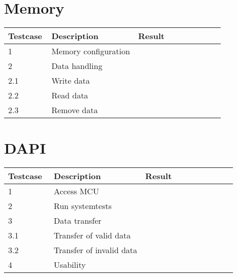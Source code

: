 \section{Memory}\label{test:memory}

\begin{longtable}[]{|m{0.2\linewidth}| m{0.4\linewidth}| m{0.4\linewidth}|} \hline
	\textbf{Testcase} & \textbf{Description} & \textbf{Result}\\ \hline
	\endhead
1 & Memory configuration &\\ \hline
2 & Data handling &\\ \hline
2.1 & Write data &\\ \hline
2.2 & Read data &\\ \hline
2.3 & Remove data &\\ \hline

\end{longtable}

\section{DAPI}\label{test:dapi}

\begin{longtable}[]{|m{0.2\linewidth}| m{0.4\linewidth}| m{0.4\linewidth}|} \hline 
\textbf{Testcase} & \textbf{Description} & \textbf{Result}\\ \hline
\endhead
1 & Access MCU &\\ \hline
2 & Run systemtests &\\ \hline
3 & Data transfer &\\ \hline
3.1 & Transfer of valid data &\\ \hline
3.2 & Transfer of invalid data &\\ \hline
4 & Usability &\\ \hline

\end{longtable}

